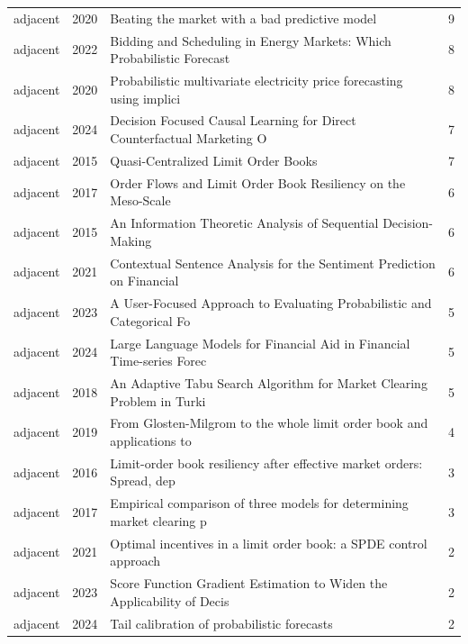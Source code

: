 \begin{longtable}{llp{9.2cm}r}
adjacent & 2020 & Beating the market with a bad predictive model~\citep{hubacek2020beating} & 9 \\
adjacent & 2022 & Bidding and Scheduling in Energy Markets: Which Probabilistic Forecast~\citep{beykirch2022bidding} & 8 \\
adjacent & 2020 & Probabilistic multivariate electricity price forecasting using implici~\citep{janke2020probabilistic} & 8 \\
adjacent & 2024 & Decision Focused Causal Learning for Direct Counterfactual Marketing O~\citep{zhou2024decision} & 7 \\
adjacent & 2015 & Quasi-Centralized Limit Order Books~\citep{gould2015quasi} & 7 \\
adjacent & 2017 & Order Flows and Limit Order Book Resiliency on the Meso-Scale~\citep{bechler2017order} & 6 \\
adjacent & 2015 & An Information Theoretic Analysis of Sequential Decision-Making~\citep{dorpinghaus2015information} & 6 \\
adjacent & 2021 & Contextual Sentence Analysis for the Sentiment Prediction on Financial~\citep{pontes2021contextual} & 6 \\
adjacent & 2023 & A User-Focused Approach to Evaluating Probabilistic and Categorical Fo~\citep{loveday2023user} & 5 \\
adjacent & 2024 & Large Language Models for Financial Aid in Financial Time-series Forec~\citep{islam2024large} & 5 \\
adjacent & 2018 & An Adaptive Tabu Search Algorithm for Market Clearing Problem in Turki~\citep{kurt2018adaptive} & 5 \\
adjacent & 2019 & From Glosten-Milgrom to the whole limit order book and applications to~\citep{huang2019glosten} & 4 \\
adjacent & 2016 & Limit-order book resiliency after effective market orders: Spread, dep~\citep{xu2016limit} & 3 \\
adjacent & 2017 & Empirical comparison of three models for determining market clearing p~\citep{ceyhan2017empirical} & 3 \\
adjacent & 2021 & Optimal incentives in a limit order book: a SPDE control approach~\citep{baldacci2021optimal} & 2 \\
adjacent & 2023 & Score Function Gradient Estimation to Widen the Applicability of Decis~\citep{silvestri2023score} & 2 \\
adjacent & 2024 & Tail calibration of probabilistic forecasts~\citep{allen2024tail} & 2 \\

\end{longtable}
